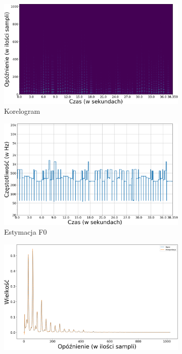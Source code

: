 \documentclass[12pt,a4paper,twoside]{mwart}
\begin{document}
\begin{figure}[ht]
  \begin{subfigure}{.49\textwidth}
    \includegraphics[width=1.\linewidth]{images/ACLOS/Korelogram_cropped.png}
    \caption{Korelogram}
  \end{subfigure}
  \begin{subfigure}{.5\textwidth}
    \includegraphics[width=1.\linewidth]{images/ACLOS/Estymacja_f0_cropped.png}
    \caption{Estymacja F0}
  \end{subfigure}
  \newline
  \begin{subfigure}{0.5\textwidth}
    \centering
    \includegraphics[width=1.\linewidth]{images/ACLOS/interpolacja_full_cropped.png}

\end{subfigure}
\end{figure}
\end{document}
